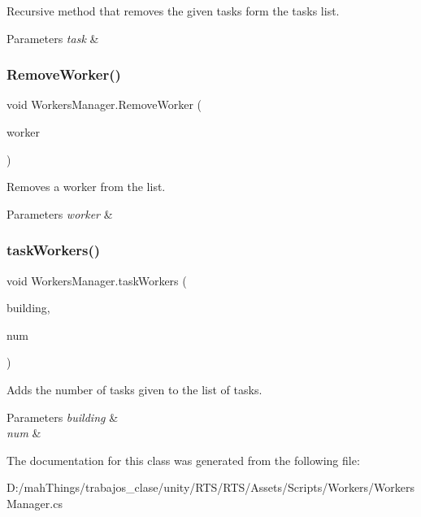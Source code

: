 Recursive method that removes the given tasks form the tasks list. 


\begin{DoxyParams}{Parameters}
{\em task} & \\
\hline
\end{DoxyParams}
\mbox{\label{class_workers_manager_aad4e89044cdc4a0cf7445b2fc1b445aa}} 
\subsubsection{\texorpdfstring{Remove\+Worker()}{RemoveWorker()}}
{\footnotesize\ttfamily void Workers\+Manager.\+Remove\+Worker (\begin{DoxyParamCaption}\item[{\mbox{\hyperlink{class_worker}{Worker}}}]{worker }\end{DoxyParamCaption})}



Removes a worker from the list. 


\begin{DoxyParams}{Parameters}
{\em worker} & \\
\hline
\end{DoxyParams}
\mbox{\label{class_workers_manager_ae24e5cff6ca762e22b11ae022a427047}} 
\subsubsection{\texorpdfstring{task\+Workers()}{taskWorkers()}}
{\footnotesize\ttfamily void Workers\+Manager.\+task\+Workers (\begin{DoxyParamCaption}\item[{Game\+Object}]{building,  }\item[{int}]{num }\end{DoxyParamCaption})}



Adds the number of tasks given to the list of tasks. 


\begin{DoxyParams}{Parameters}
{\em building} & \\
\hline
{\em num} & \\
\hline
\end{DoxyParams}


The documentation for this class was generated from the following file\+:\begin{DoxyCompactItemize}
\item 
D\+:/mah\+Things/trabajos\+\_\+clase/unity/\+R\+T\+S/\+R\+T\+S/\+Assets/\+Scripts/\+Workers/Workers\+Manager.\+cs\end{DoxyCompactItemize}
